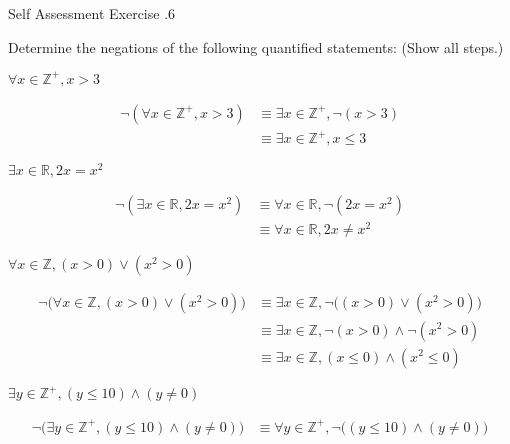 \documentclass[\main/notes.tex]{subfiles}
\begin{document}
			\begin{exercise}{Self Assessment Exercise \thechapter.6}
				\begin{questions}
					\item Determine the negations of the following quantified statements: (Show all steps.)
						\begin{questions}
							\item $\forall x \in \mathbb{Z}^{+}, x > 3$
								\begin{answer}
									\begin{align*}
										\lnot (\forall x \in \mathbb{Z}^{+}, x > 3) &\equiv \exists x \in \mathbb{Z}^{+}, \lnot (x > 3)\\
										& \equiv \exists x \in \mathbb{Z}^{+}, x \leq 3
									\end{align*}
								\end{answer}
							\item $\exists x \in \mathbb{R}, 2x = x^{2}$
								\begin{answer}
									\begin{align*}
										\lnot (\exists x \in \mathbb{R}, 2x = x^{2}) & \equiv \forall x \in \mathbb{R}, \lnot(2x = x^{2})\\
										& \equiv \forall x \in \mathbb{R}, 2x \neq x^{2}
									\end{align*}
								\end{answer}
							\item $\forall x \in \mathbb{Z}, (x > 0) \lor (x^{2} > 0)$
								\begin{answer}
									\begin{align*}
										\lnot \bigl(\forall x \in \mathbb{Z}, (x > 0) \lor (x^{2} > 0)\bigr) & \equiv \exists x \in \mathbb{Z}, \lnot \bigl((x > 0) \lor (x^{2} > 0)\bigr)\\
										& \equiv \exists x \in \mathbb{Z}, \lnot (x > 0) \land \lnot (x^{2} > 0)\\
										& \equiv \exists x \in \mathbb{Z}, (x \leq 0) \land (x^{2} \leq 0)
									\end{align*}
								\end{answer}
							\item $\exists y \in \mathbb{Z}^{+}, (y \leq 10) \land (y \neq 0)$
								\begin{answer}
									\begin{align*}
										\lnot \bigl(\exists y \in \mathbb{Z}^{+}, (y \leq 10) \land (y \neq 0)\bigr) & \equiv \forall y \in \mathbb{Z}^{+}, \lnot \bigl((y \leq 10) \land (y \neq 0)\bigr)\\

\end{align*}
\end{answer}
\end{questions}
\end{questions}
\end{exercise}
\end{document}
